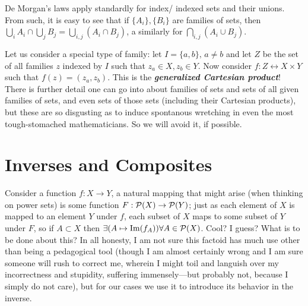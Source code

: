 \documentclass{report}
\begin{document}


De Morgan's laws apply standardly for index/ indexed sets and their unions. From such, it is easy to see that if \( \{A_i\}, \{B_i\}     \) are families of sets, then \( \bigcup_{i} A_i \cap \bigcup_j B_j = \bigcup_{i,j} (A_i \cap  B_j) \), a similarly for \( \bigcap_{i,j}  (A_i  \cup B_j) \). 

Let us consider a special type of family: let \( I=\{a,b\}, \, a\neq b   \) and let \( Z \) be the set of all families \( z \) indexed by \( I \) such that \( z_a \in X, z_b \in Y \). Now consider \( f : Z \leftrightarrow X \times Y \) such that \( f(z)=(z_a,z_b) \). This is the \textbf{\textit{generalized Cartesian product}}! There is further detail one can go into about families of sets and sets of all given families of sets, and even sets of those sets (including their Cartesian products), but these are so disgusting as to induce spontanous wretching in even the most tough-stomached mathematicians. So we will avoid it, if possible. 

\section{Inverses and Composites}

Consider a function \( f : X \to  Y \), a natural mapping that might arise (when thinking on power sets) is some function \( F : \mathcal{P} (X) \to  \mathcal{P}(Y) \); just as each element of \( X \) is mapped to an element \( Y \) under \( f \), each subset of \( X \) maps to some subset of \( Y \) under \( F \), so if \( A \subset  X \) then \(\exists (A \mapsto \operatorname{Im} (f_A)) \forall  A \in  \mathcal{P}(X) \). Cool? I guess? What is to be done about this? In all honesty, I am not sure this factoid has much use other than being a pedagogical tool (though I am almost certainly wrong and I am sure someone will rush to correct me, wherein I might toil and languish over my incorrectness and stupidity, suffering immensely---but probably not, because I simply do not care), but for our cases we use it to introduce its behavior in the inverse. 
\end{document}
